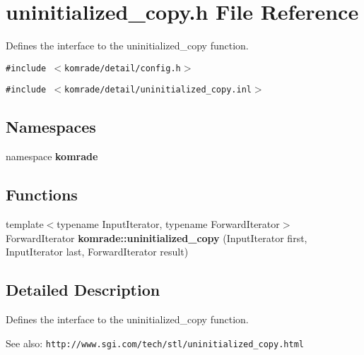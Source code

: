 \section{uninitialized\_\-copy.h File Reference}
\label{uninitialized__copy_8h}
Defines the interface to the uninitialized\_\-copy function. 

{\tt \#include $<$komrade/detail/config.h$>$}\par
{\tt \#include $<$komrade/detail/uninitialized\_\-copy.inl$>$}\par
\subsection*{Namespaces}
\begin{CompactItemize}
\item 
namespace {\bf komrade}
\end{CompactItemize}
\subsection*{Functions}
\begin{CompactItemize}
\item 
{\footnotesize template$<$typename InputIterator, typename ForwardIterator$>$ }\\ForwardIterator {\bf komrade::uninitialized\_\-copy} (InputIterator first, InputIterator last, ForwardIterator result)
\end{CompactItemize}


\subsection{Detailed Description}
Defines the interface to the uninitialized\_\-copy function. 

\begin{Desc}
\item[See also:]{\tt http://www.sgi.com/tech/stl/uninitialized\_\-copy.html} \end{Desc}
